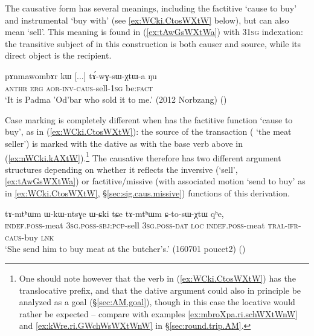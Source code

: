 The causative form  has several meanings, including the factitive `cause to buy' and instrumental  `buy with' (see \ref{ex:WCki.CtosWXtW} below), but can also mean `sell'. This meaning is found in (\ref{ex:tAwGsWXtWa}) with 3\fl{}\textsc{1sg} indexation: the transitive subject of  in this construction is both causer and source, while its direct object is the recipient.

\begin{exe}
\ex \label{ex:tAwGsWXtWa}
\gll  pɤnmawombɤr kɯ [...] tɤ́-wɣ-sɯ-χtɯ-a ŋu \\
\textsc{anthr} \textsc{erg} { } \textsc{aor}-\textsc{inv}-\textsc{caus}-sell-\textsc{1sg} be:\textsc{fact} \\
\glt `It is Padma 'Od'bar who sold it to me.' (2012 Norbzang)
()
\end{exe} 

Case marking is completely different when  has the factitive function `cause to buy', as in (\ref{ex:WCki.CtosWXtW}): the source of the transaction ( `the meat seller') is marked with the dative as with the base verb above in (\ref{ex:nWCki.kAXtW}).\footnote{One should note however that the verb in (\ref{ex:WCki.CtosWXtW}) has the translocative prefix, and that the dative argument could also in principle be analyzed as a goal (§\ref{sec:AM.goal}), though in this case the locative  would rather be expected -- compare with examples \ref{ex:mbroXpa.ri.schWXtWnW}  and \ref{ex:kWre.ri.GWchWsWXtWnW} in §\ref{sec:round.trip.AM}.} The causative   therefore has two different argument structures depending on whether it reflects the inversive (`sell', \ref{ex:tAwGsWXtWa}) or factitive/missive (with associated motion `send to buy' as in \ref{ex:WCki.CtosWXtW}, §\ref{sec:sig.caus.missive}) functions of this derivation.

\begin{exe}
\ex \label{ex:WCki.CtosWXtW}
\gll tɤ-mtʰɯm ɯ-kɯ-ntsɣe ɯ-ɕki tɕe tɤ-mtʰɯm ɕ-to-sɯ-χtɯ qʰe, \\
\textsc{indef}.\textsc{poss}-meat \textsc{3sg}.\textsc{poss}-\textsc{sbj}:\textsc{pcp}-sell \textsc{3sg}.\textsc{poss}-\textsc{dat} \textsc{loc} \textsc{indef}.\textsc{poss}-meat \textsc{tral}-\textsc{ifr}-\textsc{caus}-buy \textsc{lnk} \\
\glt `She send him to buy meat at the butcher's.' (160701 poucet2)
()
\end{exe}

